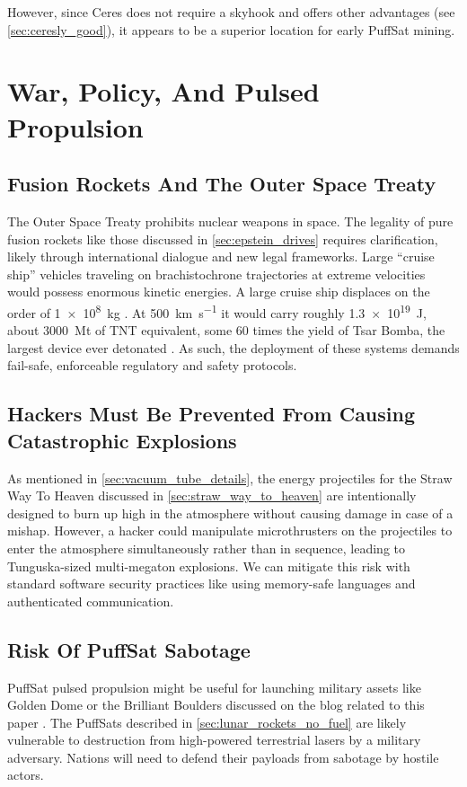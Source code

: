 \documentclass{article}
\begin{document}
However, since Ceres does not require a skyhook and offers other advantages (see \autoref{sec:ceresly_good}), it appears to be a superior location for early PuffSat mining.



\section{War, Policy, And Pulsed Propulsion}
\subsection{Fusion Rockets And The Outer Space Treaty}
The Outer Space Treaty \cite{outer_space_treaty} prohibits nuclear weapons in space. The legality of pure fusion rockets like those discussed in \autoref{sec:epstein_drives} requires clarification, likely through international dialogue and new legal frameworks.  Large ``cruise ship'' vehicles traveling on brachistochrone trajectories at extreme velocities would possess enormous kinetic energies. A large cruise ship displaces on the order of \SI{1e8}{\kilo\gram} \cite{livescience_cruise_displacement}.  At \SI{500}{\kilo\meter\per\second} it would carry roughly \SI{1.3e19}{\joule}, about \SI{3000}{\mega\tonne} of TNT equivalent, some 60 times the yield of Tsar Bomba, the largest device ever detonated \cite{tsar_bomba_ahf}. As such, the deployment of these systems demands fail-safe, enforceable regulatory and safety protocols.

\subsection{Hackers Must Be Prevented From Causing Catastrophic Explosions}
As mentioned in \autoref{sec:vacuum_tube_details}, the energy projectiles for the Straw Way To Heaven discussed in \autoref{sec:straw_way_to_heaven} are intentionally designed to burn up high in the atmosphere without causing damage in case of a mishap.  However, a hacker could manipulate microthrusters on the projectiles to enter the atmosphere simultaneously rather than in sequence, leading to Tunguska-sized \cite{longo2007tunguska} multi-megaton explosions.  We can mitigate this risk with standard software security practices like using memory-safe languages and authenticated communication.

\subsection{Risk Of PuffSat Sabotage}
PuffSat pulsed propulsion might be useful for launching military assets like Golden Dome \cite{crs_golden_dome} or the Brilliant Boulders \cite{brilliant_boulders} discussed on the blog related to this paper \cite{aim2024}.   The PuffSats described in \autoref{sec:lunar_rockets_no_fuel} are likely vulnerable to destruction from high-powered terrestrial lasers by a military adversary.  Nations will need to defend their payloads from sabotage by hostile actors.
\end{document}
